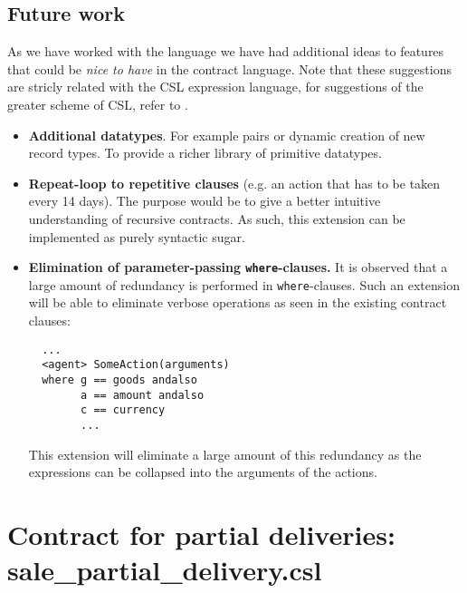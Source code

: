 \documentclass[10pt,a4paper,final,oneside,openany,article]{memoir}
\begin{document}
\section{Future work}
As we have worked with the language we have had additional ideas to
features that could be \textit{nice to have} in the contract language.
Note that these suggestions are stricly related with the CSL expression
language, for suggestions of the greater scheme of CSL, refer to
\cite{hvitved10}.
\begin{itemize}
\item \textbf{Additional datatypes}. For example pairs or dynamic
  creation of new record types. To provide a richer library of primitive
  datatypes.
\item \textbf{Repeat-loop to repetitive clauses} (e.g. an action that
  has to be taken every 14 days). The purpose would be to give a better
  intuitive understanding of recursive contracts. As such, this
  extension can be implemented as purely syntactic sugar.
\item \textbf{Elimination of parameter-passing \lstinline{where}-clauses.} It is
  observed that a large amount of redundancy is performed in
  \lstinline{where}-clauses. Such an extension will be able to eliminate
  verbose operations as seen in the existing contract clauses:
  \begin{lstlisting}
  ...
  <agent> SomeAction(arguments)
  where g == goods andalso
        a == amount andalso
        c == currency
        ...
  \end{lstlisting}
  This extension will eliminate a large amount of this redundancy as
  the expressions can be collapsed into the arguments of the actions.
\end{itemize}

\printbibliography


\newpage
    \appendix
\chapter{Contract for partial deliveries: sale\_partial\_delivery.csl}
\label{chap:sale_partial_delivery}

\end{document}
